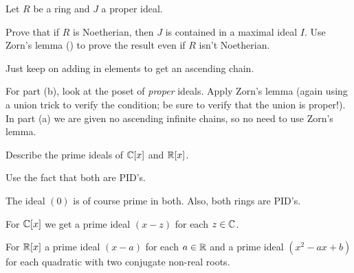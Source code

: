 \begin{sproblem}
	\label{prob:krull_max_ideal}
	Let $R$ be a ring and $J$ a proper ideal.
	\begin{enumerate}[(a)]
		\ii Prove that if $R$ is Noetherian,
		then $J$ is contained in a maximal ideal $I$.
		\ii Use Zorn's lemma ()
		to prove the result even if $R$ isn't Noetherian.
	\end{enumerate}
	\begin{hint}
		Just keep on adding in elements to get an ascending chain.
	\end{hint}
	\begin{sol}
		For part (b), look at the poset of \emph{proper} ideals.
		Apply Zorn's lemma (again using a union trick to verify the condition;
		be sure to verify that the union is proper!).
		In part (a) we are given no ascending infinite chains,
		so no need to use Zorn's lemma.
	\end{sol}
\end{sproblem}

\begin{problem}
	[{$\Spec k[x]$}]
	Describe the prime ideals of $\mathbb C[x]$ and $\mathbb R[x]$.
	\begin{hint}
		Use the fact that both are PID's.
	\end{hint}
	\begin{sol}
		The ideal $(0)$ is of course prime in both.
		Also, both rings are PID's.

		For $\mathbb C[x]$ we get a prime ideal $(x-z)$ for each $z \in \mathbb C$.

		For $\mathbb R[x]$ a prime ideal $(x-a)$ for each $a \in \mathbb R$
		and a prime ideal $(x^2 - ax + b)$ for each quadratic
		with two conjugate non-real roots.
	\end{sol}
\end{problem}


